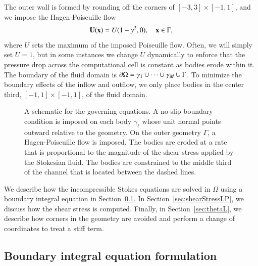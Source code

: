 \documentclass[preprint, 10pt]{elsarticle}
\begin{document}
The outer wall is formed by rounding off the corners
of $[-3,3] \times [-1,1]$, and we impose the Hagen-Poiseuille flow
\begin{align*}
  {\mathbf{U}}({\mathbf{x}}) = U (1-y^2,0), \quad {\mathbf{x}} \in \Gamma,
\end{align*}
where $U$ sets the maximum of the imposed Poiseuille flow. Often, we
will simply set $U=1$, but in some instances we change $U$ dynamically
to enforce that the pressure drop across the computational cell is
constant as bodies erode within it.  The boundary of the fluid domain is
${\partial}\Omega = \gamma_1 \cup \cdots \cup \gamma_M \cup \Gamma$.  To
minimize the boundary effects of the inflow and outflow, we only place
bodies in the center third, $[-1,1] \times [-1,1]$, of the fluid domain.

\begin{figure}[htpb]
  \centering
  
  \caption{\label{fig:schematic} A schematic for the governing
    equations.  A no-slip boundary condition is imposed on each body
    $\gamma_\ell$ whose unit normal points outward relative to the
    geometry.  On the outer geometry $\Gamma$, a Hagen-Poiseuille flow
    is imposed.  The bodies are eroded at a rate that is proportional to
    the magnitude of the shear stress applied by the Stokesian fluid.
    The bodies are constrained to the middle third of the channel that
    is located between the dashed lines.}
\end{figure}

We describe how the incompressible Stokes equations are solved in
$\Omega$ using a boundary integral equation in Section~\ref{sec:bies}.
In Section~\ref{sec:shearStressLP}, we discuss how the shear stress is
computed.  Finally, in Section~\ref{sec:thetaL}, we describe how corners
in the geometry are avoided and perform a change of coordinates to treat
a stiff term.


\subsection{Boundary integral equation formulation} 
\label{sec:bies}
\end{document}
